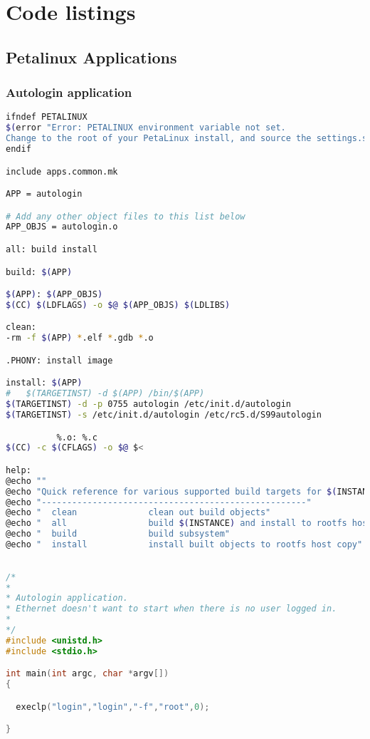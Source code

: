 \chapter{Code listings}

\section{Petalinux Applications}

\subsection{Autologin application}

\label{APP:AUTOLOGIN}

\begin{lstlisting}[language=bash]
ifndef PETALINUX
$(error "Error: PETALINUX environment variable not set. 
Change to the root of your PetaLinux install, and source the settings.sh file")
endif

include apps.common.mk

APP = autologin

# Add any other object files to this list below
APP_OBJS = autologin.o

all: build install

build: $(APP)

$(APP): $(APP_OBJS)
$(CC) $(LDFLAGS) -o $@ $(APP_OBJS) $(LDLIBS)

clean:
-rm -f $(APP) *.elf *.gdb *.o

.PHONY: install image

install: $(APP)
#	$(TARGETINST) -d $(APP) /bin/$(APP)
$(TARGETINST) -d -p 0755 autologin /etc/init.d/autologin
$(TARGETINST) -s /etc/init.d/autologin /etc/rc5.d/S99autologin

          %.o: %.c
$(CC) -c $(CFLAGS) -o $@ $<

help:
@echo ""
@echo "Quick reference for various supported build targets for $(INSTANCE)."
@echo "----------------------------------------------------"
@echo "  clean              clean out build objects"
@echo "  all                build $(INSTANCE) and install to rootfs host copy"
@echo "  build              build subsystem"
@echo "  install            install built objects to rootfs host copy"

\end{lstlisting}

\begin{lstlisting}[language=C]

/*
*
* Autologin application. 
* Ethernet doesn't want to start when there is no user logged in.
*
*/
#include <unistd.h>
#include <stdio.h>

int main(int argc, char *argv[])
{

  execlp("login","login","-f","root",0);

}


\end{lstlisting}

